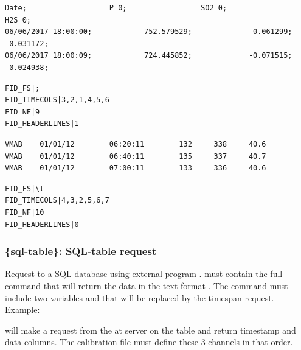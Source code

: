 \begin{lstlisting}[language={},title=Generic ASCII format example 1: time + data channels 1 to 3.]
               Date;                   P_0;                 SO2_0;                 H2S_0;
06/06/2017 18:00:00;            752.579529;             -0.061299;             -0.031172;
06/06/2017 18:00:09;            724.445852;             -0.071515;             -0.024938;
\end{lstlisting}

\begin{lstlisting}[title=\wokey{FID\_*} parameters to read example 1 file.]
FID_FS|;
FID_TIMECOLS|3,2,1,4,5,6
FID_NF|9
FID_HEADERLINES|1
\end{lstlisting}


\begin{lstlisting}[language={},title=Generic ASCII format example 2: data channel 1 (all NaN) + time + data channels 2 to 4.]
VMAB    01/01/12        06:20:11        132     338     40.6
VMAB    01/01/12        06:40:11        135     337     40.7
VMAB    01/01/12        07:00:11        133     336     40.6
\end{lstlisting}


\begin{lstlisting}[title=\wokey{FID\_*} parameters to read example 2 file.]
FID_FS|\t
FID_TIMECOLS|4,3,2,5,6,7
FID_NF|10
FID_HEADERLINES|0
\end{lstlisting}


\subsubsection{\{sql-table\}: SQL-table request}

Request to a SQL database using external program .  must contain the full command that will return the data in the text format . The command must include two variables  and  that will be replaced by the timespan request. Example:


will make a request from the  at server  on the table  and return timestamp and data columns. The calibration file must define these 3 channels in that order.

